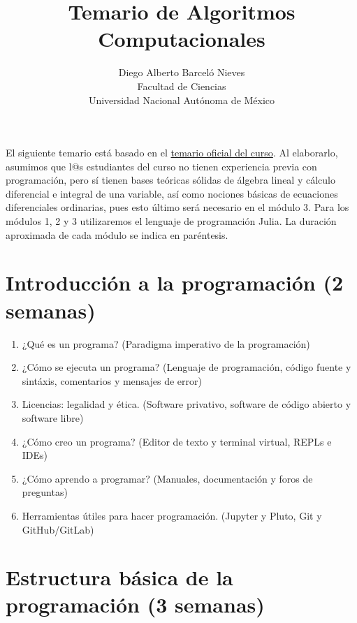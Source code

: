 \documentclass[a4paper]{article}
\begin{document}
\title{Temario de Algoritmos Computacionales}
\author{Diego Alberto Barceló Nieves \\ Facultad de Ciencias \\ Universidad Nacional Autónoma de México}
\date{}
\maketitle

El siguiente temario está basado en el \href{https://www.fciencias.unam.mx/estudiar-en-ciencias/estudios/licenciaturas/asignaturas/2016/1430}{temario oficial del curso}. Al elaborarlo, asumimos que l@s estudiantes del curso no tienen experiencia previa con programación, pero sí tienen bases teóricas sólidas de álgebra lineal y cálculo diferencial e integral de una variable, así como nociones básicas de ecuaciones diferenciales ordinarias, pues esto último será necesario en el módulo 3. Para los módulos 1, 2 y 3 utilizaremos el lenguaje de programación Julia. La duración aproximada de cada módulo se indica en paréntesis.

\setcounter{section}{-1}

\section{Introducción a la programación (2 semanas)} \label{Sec: Introducción a la programación (2 semanas)} 

\begin{enumerate}[label=\arabic*.]

    \item ¿Qué es un programa? (Paradigma imperativo de la programación)

    \item ¿Cómo se ejecuta un programa? (Lenguaje de programación, código fuente y sintáxis, comentarios y mensajes de error)
    \item Licencias: legalidad y ética. (Software privativo, software de código abierto y software libre)
    \item ¿Cómo creo un programa? (Editor de texto y terminal virtual, REPLs e IDEs)
    \item ¿Cómo aprendo a programar? (Manuales, documentación y foros de preguntas)
    \item Herramientas útiles para hacer programación. (Jupyter y Pluto, Git y GitHub/GitLab)
\end{enumerate}

\section{Estructura básica de la programación (3 semanas)} \label{Sec: Estructura básica de la programación (3 semanas)}
\end{document}
